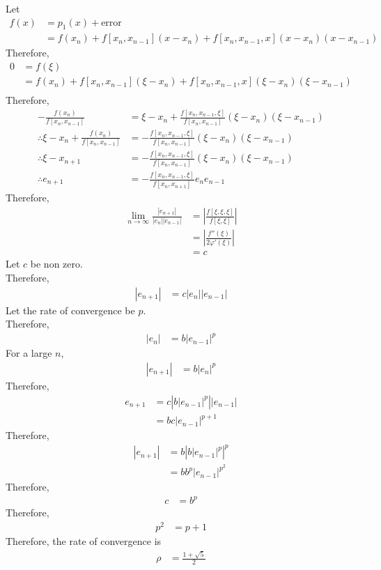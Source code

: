 \documentclass[fleqn, a4paper, 12pt, twoside, titlepage]{article}
\theoremstyle{definition}
\theoremstyle{theorem}
\begin{document}
Let
\begin{align*}
	f(x) &= p_1(x) + \text{error}\\
	&= f(x_n) + f[x_n,x_{n - 1}] (x - x_n) + f[x_n,x_{n - 1},x] (x - x_n) (x - x_{n - 1})
\end{align*}
Therefore,
\begin{align*}
	0 &= f(\xi)\\
	&= f(x_n) + f[x_n,x_{n - 1}] (\xi - x_n) + f[x_n,x_{n - 1},x] (\xi - x_n) (\xi - x_{n - 1})\\
\end{align*}
Therefore,
\begin{align*}
	-\frac{f(x_n)}{f[x_n,x_{n - 1}]} &= \xi - x_n + \frac{f[x_n,x_{n - 1},\xi]}{f[x_n,x_{n - 1}]} (\xi - x_n) (\xi - x_{n - 1})\\
	\therefore \xi - x_n + \frac{f(x_n)}{f[x_n,x_{n - 1}]} &= -\frac{f[x_n,x_{n - 1},\xi]}{f[x_n,x_{n - 1}]} (\xi - x_n) (\xi - x_{n - 1})\\
	\therefore \xi - x_{n + 1} &= -\frac{f[x_n,x_{n - 1},\xi]}{f[x_n,x_{n - 1}]} (\xi - x_n) (\xi - x_{n - 1})\\
	\therefore e_{n + 1} &= -\frac{f[x_n,x_{n - 1},\xi]}{f[x_n,x_{n + 1}]} e_n e_{n - 1}
\end{align*}
Therefore,
\begin{align*}
	\lim\limits_{n \to \infty} \frac{|e_{n + 1}|}{|e_n| |e_{n - 1}|} &= \left| \frac{f[\xi,\xi,\xi]}{f[\xi,\xi]} \right|\\
	&= \left| \frac{f''(\xi)}{2 \varphi'(\xi)} \right|\\
	&= c
\end{align*}
Let $c$ be non zero.\\
Therefore,
\begin{align*}
	|e_{n + 1}| &= c |e_n| |e_{n - 1}|
\end{align*}
Let the rate of convergence be $p$.\\
Therefore,
\begin{align*}
	|e_n| &= b |e_{n - 1}|^p
\end{align*}
For a large $n$,
\begin{align*}
	|e_{n + 1}| &= b |e_n|^p
\end{align*}
Therefore,
\begin{align*}
	e_{n + 1} &= c \left| b |e_{n - 1}|^p \right| |e_{n - 1}|\\
	&= b c |e_{n - 1}|^{p + 1}
\end{align*}
Therefore,
\begin{align*}
	|e_{n + 1}| &= b \left| b |e_{n - 1}|^p \right|^p\\
	&= b b^p |e_{n - 1}|^{p^2}
\end{align*}
Therefore,
\begin{align*}
	c &= b^p
\end{align*}
Therefore,
\begin{align*}
	p^2 &= p + 1
\end{align*}
Therefore, the rate of convergence is
\begin{align*}
	\rho &= \frac{1 + \sqrt{5}}{2}
\end{align*}
\end{document}
